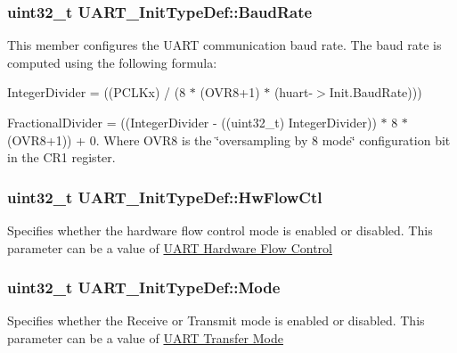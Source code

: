 \subsubsection[{\texorpdfstring{Baud\+Rate}{BaudRate}}]{\setlength{\rightskip}{0pt plus 5cm}uint32\+\_\+t U\+A\+R\+T\+\_\+\+Init\+Type\+Def\+::\+Baud\+Rate}\hypertarget{struct_u_a_r_t___init_type_def_ae460c2e4d7ddc67bca9f5756f45b1d83}{}\label{struct_u_a_r_t___init_type_def_ae460c2e4d7ddc67bca9f5756f45b1d83}
This member configures the U\+A\+RT communication baud rate. The baud rate is computed using the following formula\+:
\begin{DoxyItemize}
\item Integer\+Divider = ((P\+C\+L\+Kx) / (8 $\ast$ (O\+V\+R8+1) $\ast$ (huart-\/$>$Init.\+Baud\+Rate)))
\item Fractional\+Divider = ((Integer\+Divider -\/ ((uint32\+\_\+t) Integer\+Divider)) $\ast$ 8 $\ast$ (O\+V\+R8+1)) + 0. Where O\+V\+R8 is the \char`\"{}oversampling by 8 mode\char`\"{} configuration bit in the C\+R1 register. 
\end{DoxyItemize}
\subsubsection[{\texorpdfstring{Hw\+Flow\+Ctl}{HwFlowCtl}}]{\setlength{\rightskip}{0pt plus 5cm}uint32\+\_\+t U\+A\+R\+T\+\_\+\+Init\+Type\+Def\+::\+Hw\+Flow\+Ctl}\hypertarget{struct_u_a_r_t___init_type_def_adbf4734130666b94201c6658464c1622}{}\label{struct_u_a_r_t___init_type_def_adbf4734130666b94201c6658464c1622}
Specifies whether the hardware flow control mode is enabled or disabled. This parameter can be a value of \hyperlink{group___u_a_r_t___hardware___flow___control}{U\+A\+RT Hardware Flow Control} 
\subsubsection[{\texorpdfstring{Mode}{Mode}}]{\setlength{\rightskip}{0pt plus 5cm}uint32\+\_\+t U\+A\+R\+T\+\_\+\+Init\+Type\+Def\+::\+Mode}\hypertarget{struct_u_a_r_t___init_type_def_ab2ee6ea5a5d4ca5ee6b759be197bcfcb}{}\label{struct_u_a_r_t___init_type_def_ab2ee6ea5a5d4ca5ee6b759be197bcfcb}
Specifies whether the Receive or Transmit mode is enabled or disabled. This parameter can be a value of \hyperlink{group___u_a_r_t___mode}{U\+A\+RT Transfer Mode} 
